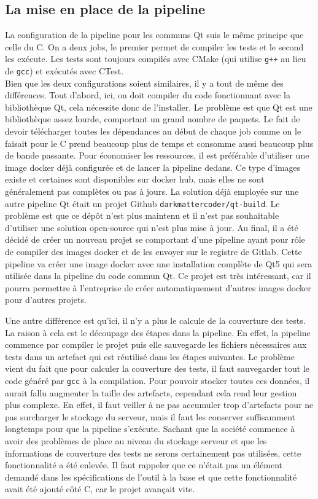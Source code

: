 \documentclass[a4paper]{article}
\begin{document}
\subsection{La mise en place de la pipeline}%

La configuration de la pipeline pour les communs Qt suis le même principe que
celle du C. On a deux jobs, le premier permet de compiler les tests et le second
les exécute. Les tests sont toujours compilés avec CMake (qui utilise \verb|g++|
au lieu de \verb|gcc|) et exécutés avec CTest.\\

Bien que les deux configurations soient similaires, il y a tout de même des
différences. Tout d'abord, ici, on doit compiler du code fonctionnant avec la
bibliothèque Qt, cela nécessite donc de l'installer. Le problème est que Qt est
une bibliothèque assez lourde, comportant un grand nombre de paquets. Le fait de
devoir télécharger toutes les dépendances au début de chaque job comme on le
faisait pour le C prend beaucoup plus de temps et consomme aussi beaucoup plus
de bande passante. Pour économiser les ressources, il est préférable d'utiliser
une image docker déjà configurée et de lancer la pipeline dedans. Ce type
d'images existe et certaines sont disponibles sur docker hub, mais elles ne sont
généralement pas complètes ou pas à jours. La solution déjà employée sur une
autre pipeline Qt était un projet Github \verb|darkmattercoder/qt-build|. Le
problème est que ce dépôt n'est plus maintenu et il n'est pas souhaitable
d'utiliser une solution open-source qui n'est plus mise à jour. Au final, il a
été décidé de créer un nouveau projet se comportant d'une pipeline ayant pour
rôle de compiler des images docker et de les envoyer sur le registre de Gitlab.
Cette pipeline va créer une image docker avec une installation complète de Qt5
qui sera utilisée dans la pipeline du code commun Qt. Ce projet est très
intéressant, car il pourra permettre à l'entreprise de créer automatiquement
d'autres images docker pour d'autres projets.

Une autre différence est qu'ici, il n'y a plus le calcule de la couverture des
tests. La raison à cela est le découpage des étapes dans la pipeline. En effet,
la pipeline commence par compiler le projet puis elle sauvegarde les fichiers
nécessaires aux tests dans un artefact qui est réutilisé dans les étapes
suivantes. Le problème vient du fait que pour calculer la couverture des tests,
il faut sauvegarder tout le code généré par \verb|gcc| à la compilation. Pour
pouvoir stocker toutes ces données, il aurait fallu augmenter la taille des
artefacts, cependant cela rend leur gestion plus complexe. En effet, il faut
veiller à ne pas accumuler trop d'artefacts pour ne pas surcharger le stockage
du serveur, mais il faut les conserver suffisamment longtemps pour que la
pipeline s'exécute. Sachant que la société commence à avoir des problèmes de
place au niveau du stockage serveur et que les informations de couverture des
tests ne serons certainement pas utilisées, cette fonctionnalité a été enlevée.
Il faut rappeler que ce n'était pas un élément demandé dans les spécifications
de l'outil à la base et que cette fonctionnalité avait été ajouté côté C, car le
projet avançait vite.
\end{document}

